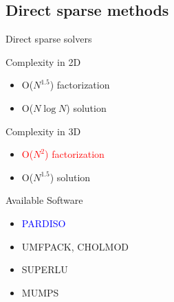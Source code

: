 \documentclass[handout]{beamer}
{
\usepackage{fullpage}
\usepackage{hyperref}
\usepackage{amssymb} 
}
\newcommand{\red}[1]{\textcolor{red}{#1}}
\newcommand{\blue}[1]{\textcolor{blue}{#1}}
\begin{document}
\subsection{Direct sparse methods}

\begin{frame}{Direct sparse solvers}

\begin{center}

\begin{minipage}{0.45\textwidth}
\begin{block}{Complexity in 2D}
  \begin{itemize}
  \item O($N^{1.5}$) factorization 
  \item O($N \log N$) solution
  \end{itemize}  
\end{block}
\end{minipage}
\hfill
\begin{minipage}{0.45\textwidth}
\begin{block}{Complexity in 3D}
  \begin{itemize}
  \item \red{O($N^{2}$) factorization}
  \item O($N^{1.5}$) solution
  \end{itemize}  
\end{block}
\end{minipage}

\bigskip

\bigskip

\begin{minipage}{0.6\textwidth}
Available Software
{\small
  \begin{itemize}
  \item \blue{PARDISO}
  \item UMFPACK, CHOLMOD
  \item SUPERLU
  \item MUMPS
  \end{itemize}  
}
\end{minipage}

\end{center}

\end{frame}
\end{document}
